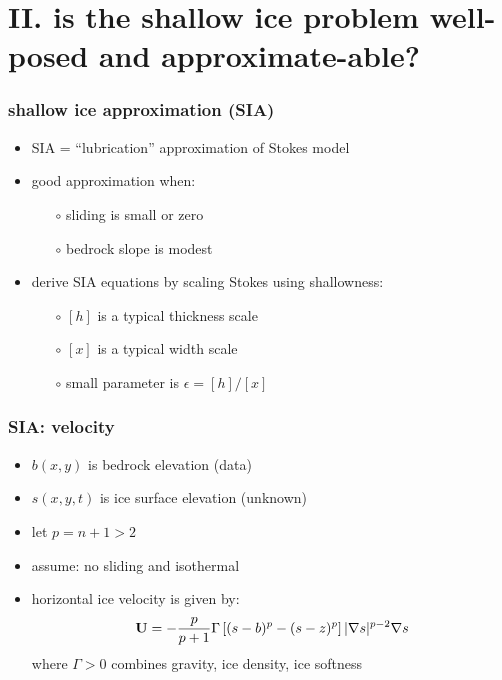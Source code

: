 \documentclass[hide notes,intlimits]{beamer}
\newcommand{\eps}{\epsilon}
\begin{document}
\section[shallow ice well-posed?]{II. is the shallow ice problem well-posed and approximate-able?}


\begin{frame}
  \frametitle{shallow ice approximation (SIA)}

\begin{itemize}
\item SIA = ``lubrication'' approximation of Stokes model
\item good approximation when:
  \begin{itemize}
  \item[$\circ$] sliding is small or zero
  \item[$\circ$] bedrock slope is modest
  \end{itemize}
\item derive SIA equations by scaling Stokes using shallowness:
  \begin{itemize}
  \item[$\circ$] $[h]$ is a typical thickness scale
  \item[$\circ$] $[x]$ is a typical width scale
  \item[$\circ$] small parameter is $\eps = [h] / [x]$
  \end{itemize}
\end{itemize}
\end{frame}


\begin{frame}
  \frametitle{SIA: velocity}
 
\begin{itemize}
\item $b(x,y)$ is bedrock elevation (data)
\item $s(x,y,t)$ is ice surface elevation (unknown)
\item let $p=n+1>2$
\item assume: no sliding and isothermal
\item horizontal ice velocity is given by: 
  $${\bf U}  =  - \frac{p}{p+1} \Gamma \left[ (s-b)^p - (s - z)^p  \right] 
|\nabla s |^{p-2} \nabla s$$
where $\Gamma > 0$ combines gravity, ice density, ice softness
\end{itemize}
\end{frame}
\end{document}
